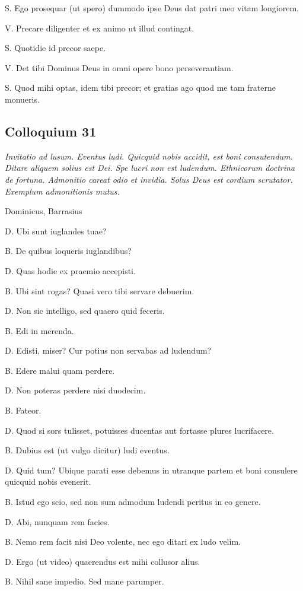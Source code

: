 \documentclass{article}
\begin{document}
S. Ego prosequar (ut spero) dummodo ipse Deus dat patri meo vitam longiorem. 

V. Precare diligenter et ex animo ut illud contingat. 

S. Quotidie id precor saepe. 

V. Det tibi Dominus Deus in omni opere bono perseverantiam. 

S. Quod mihi optas, idem tibi precor; et gratias ago quod me tam fraterne monueris. 

\subsection{Colloquium 31}
\emph{Invitatio ad lusum. Eventus ludi. Quicquid nobis accidit, est boni consutendum. Ditare aliquem solius est Dei. Spe lucri non est ludendum. Ethnicorum doctrina de fortuna. Admonitio careat odio et invidia. Solus Deus est cordium scrutator. Exemplum admonitionis mutus.}

Dominicus, Barrasius

D. Ubi sunt iuglandes tuae?

B. De quibus loqueris iuglandibus?

D. Quas hodie ex praemio accepisti. 

B. Ubi sint rogas? Quasi vero tibi servare debuerim. 

D. Non sic intelligo, sed quaero quid feceris. 

B. Edi in merenda.

D. Edisti, miser? Cur potius non servabas ad ludendum?

B. Edere malui quam perdere. 

D. Non poteras perdere nisi duodecim. 

B. Fateor. 

D. Quod si sors tulisset, potuisses ducentas aut fortasse plures lucrifacere. 

B. Dubius est (ut vulgo dicitur) ludi eventus.

D. Quid tum? Ubique parati esse debemus in utranque partem et boni consulere quicquid nobis evenerit. 

B. Istud ego scio, sed non sum admodum ludendi peritus in eo genere. 

D. Abi, nunquam rem facies. 

B. Nemo rem facit nisi Deo volente, nec ego ditari ex ludo velim. 

D. Ergo (ut video) quaerendus est mihi collusor alius. 

B. Nihil sane impedio. Sed mane parumper. 
\end{document}
